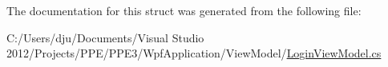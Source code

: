 The documentation for this struct was generated from the following file\-:\begin{DoxyCompactItemize}
\item 
C\-:/\-Users/dju/\-Documents/\-Visual Studio 2012/\-Projects/\-P\-P\-E/\-P\-P\-E3/\-Wpf\-Application/\-View\-Model/\hyperlink{_login_view_model_8cs}{Login\-View\-Model.\-cs}\end{DoxyCompactItemize}
